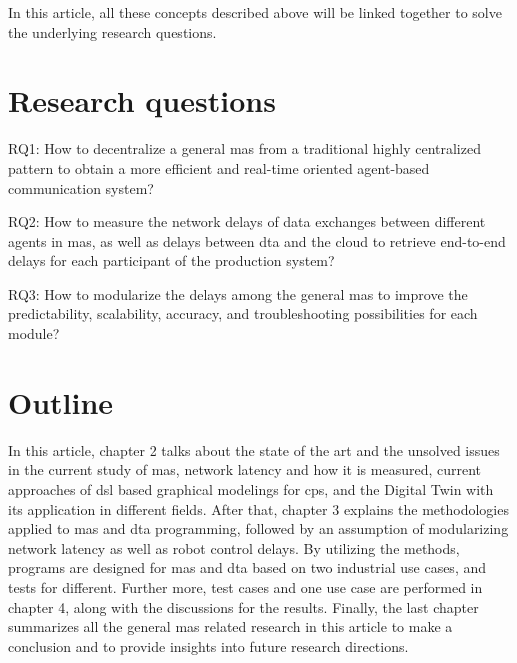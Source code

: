 In this article, all these concepts described above will be linked together to solve the 
underlying research questions.








\section{Research questions}
RQ1: How to decentralize a general \gls{mas} from a traditional highly 
centralized pattern to obtain a more efficient and real-time oriented agent-based 
communication system?

RQ2: How to measure the network delays of data exchanges between 
different agents in \gls{mas}, as well as delays between \gls{dta} and the cloud 
to retrieve end-to-end delays for each participant of the production system?

RQ3: How to modularize the delays among the general \gls{mas} to improve the 
predictability, scalability, accuracy, and troubleshooting possibilities for 
each module?  



\section{Outline}
In this article, chapter 2 talks about the state of the art and 
the unsolved issues in the current study of \gls{mas}, network 
latency and how it is measured, current approaches of \gls{dsl} 
based graphical modelings for \gls{cps}, and the Digital Twin with 
its application in different fields. After that, chapter 3 explains 
the methodologies applied to \gls{mas} and \gls{dta} programming, 
followed by an assumption of modularizing network latency as well 
as robot control delays. By utilizing the methods, programs are 
designed for \gls{mas} and \gls{dta} based on two industrial use cases, 
and tests for different. Further more, test cases and one use case are 
performed in chapter 4, along with 
the discussions for the results. Finally, the last chapter summarizes 
all the general \gls{mas} related research in this article to make a 
conclusion and to provide insights into future research directions.  
